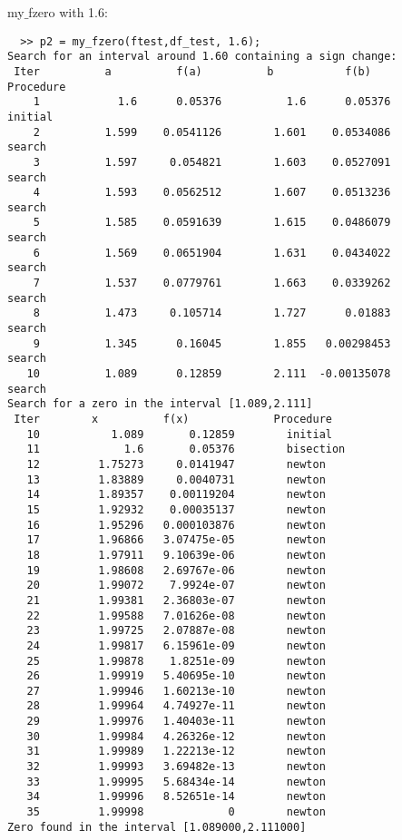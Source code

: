 \documentclass{article}
\begin{document}
my$\_$fzero with 1.6:
\begin{verbatim}
  >> p2 = my_fzero(ftest,df_test, 1.6);
Search for an interval around 1.60 containing a sign change:
 Iter          a          f(a)          b           f(b)         Procedure
    1            1.6      0.05376          1.6      0.05376        initial
    2          1.599    0.0541126        1.601    0.0534086        search
    3          1.597     0.054821        1.603    0.0527091        search
    4          1.593    0.0562512        1.607    0.0513236        search
    5          1.585    0.0591639        1.615    0.0486079        search
    6          1.569    0.0651904        1.631    0.0434022        search
    7          1.537    0.0779761        1.663    0.0339262        search
    8          1.473     0.105714        1.727      0.01883        search
    9          1.345      0.16045        1.855   0.00298453        search
   10          1.089      0.12859        2.111  -0.00135078        search
Search for a zero in the interval [1.089,2.111]
 Iter        x          f(x)             Procedure
   10           1.089       0.12859        initial
   11             1.6       0.05376        bisection
   12         1.75273     0.0141947        newton
   13         1.83889     0.0040731        newton
   14         1.89357    0.00119204        newton
   15         1.92932    0.00035137        newton
   16         1.95296   0.000103876        newton
   17         1.96866   3.07475e-05        newton
   18         1.97911   9.10639e-06        newton
   19         1.98608   2.69767e-06        newton
   20         1.99072    7.9924e-07        newton
   21         1.99381   2.36803e-07        newton
   22         1.99588   7.01626e-08        newton
   23         1.99725   2.07887e-08        newton
   24         1.99817   6.15961e-09        newton
   25         1.99878    1.8251e-09        newton
   26         1.99919   5.40695e-10        newton
   27         1.99946   1.60213e-10        newton
   28         1.99964   4.74927e-11        newton
   29         1.99976   1.40403e-11        newton
   30         1.99984   4.26326e-12        newton
   31         1.99989   1.22213e-12        newton
   32         1.99993   3.69482e-13        newton
   33         1.99995   5.68434e-14        newton
   34         1.99996   8.52651e-14        newton
   35         1.99998             0        newton
Zero found in the interval [1.089000,2.111000]
\end{verbatim}
\end{document}
